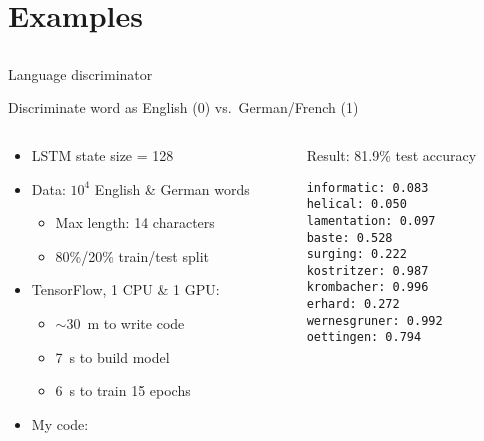 \section{Examples}
\subsection{}

\begin{frame}[fragile]{Language discriminator}
    \vspace{-1mm}
    \begin{block}{}
        Discriminate word as English (0) vs.\ German/French (1)
    \end{block}

    \centering
    

    \vspace{-3mm}
    \begin{columns}
        \begin{column}{0.61\textwidth}
            \begin{itemize}
                \item LSTM state size = 128
                \pause
                \item Data: $10^4$ English \& German words
                \begin{itemize}
                    \item Max length: 14 characters
                    \item 80\%/20\% train/test split
                \end{itemize}
                \pause
                \item TensorFlow, 1 CPU \& 1 GPU:
                \begin{itemize}
                    \item $\sim$30~m to write code
                    \item 7~s to build model
                    \item 6~s to train 15 epochs
                \end{itemize}
                \item My code: 
            \end{itemize}
        \end{column}
        \begin{column}{0.39\textwidth}
            \pause
            Result: 81.9\% test accuracy
            \vspace{-17pt}
            \footnotesize
\begin{verbatim}
informatic: 0.083
helical: 0.050
lamentation: 0.097
baste: 0.528
surging: 0.222
kostritzer: 0.987
krombacher: 0.996
erhard: 0.272
wernesgruner: 0.992
oettingen: 0.794
\end{verbatim}
        \end{column}
    \end{columns}
\end{frame}

